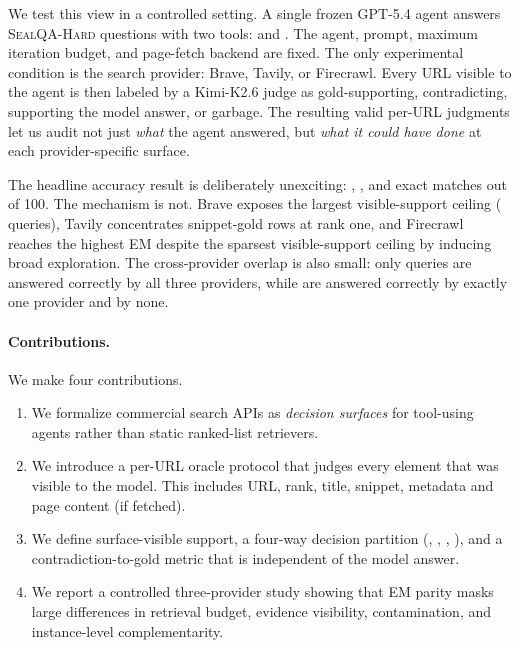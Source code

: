 We test this view in a controlled setting. A single frozen GPT-5.4 agent answers \NQueries{} \textsc{SealQA-Hard} questions with two tools: \searchWeb{} and \fetchPage{}. The agent, prompt, maximum iteration budget, and page-fetch backend are fixed. The only experimental condition is the search provider: Brave, Tavily, or Firecrawl. Every URL visible to the agent is then labeled by a Kimi-K2.6 judge as gold-supporting, contradicting, supporting the model answer, or garbage. The resulting \NJudgeValid{} valid per-URL judgments let us audit not just \emph{what} the agent answered, but \emph{what it could have done} at each provider-specific surface.

The headline accuracy result is deliberately unexciting: \BraveEM{}, \TavilyEM{}, and \FirecrawlEM{} exact matches out of 100. The mechanism is not. Brave exposes the largest visible-support ceiling (\BraveSupportVisibleQ{} queries), Tavily concentrates \TavilyRankOneGold{} snippet-gold rows at rank one, and Firecrawl reaches the highest EM despite the sparsest visible-support ceiling by inducing broad exploration. The cross-provider overlap is also small: only \AllCorrect{} queries are answered correctly by all three providers, while \OneCorrect{} are answered correctly by exactly one provider and \AllWrong{} by none.

\paragraph{Contributions.} We make four contributions.
\begin{enumerate}[leftmargin=*,topsep=2pt]
\tightlist
\item We formalize commercial search APIs as \emph{decision surfaces} for tool-using agents rather than static ranked-list retrievers.
\item We introduce a per-URL oracle protocol that judges every element that was visible to the model. This includes URL, rank, title, snippet, metadata and page content (if fetched).
\item We define surface-visible support, a four-way decision partition (\smart{}, \missed{}, \blind{}, \noop{}), and a contradiction-to-gold metric that is independent of the model answer.
\item We report a controlled three-provider study showing that EM parity masks large differences in retrieval budget, evidence visibility, contamination, and instance-level complementarity.
\end{enumerate}

